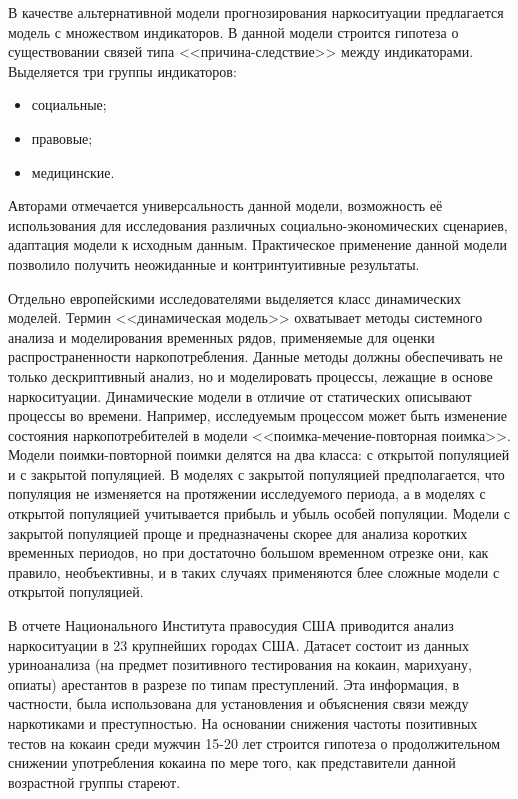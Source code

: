 В качестве альтернативной модели прогнозирования наркоситуации предлагается
модель с множеством индикаторов. В данной модели строится гипотеза о
существовании связей типа <<причина-следствие>> между индикаторами. Выделяется
три группы индикаторов: 
\begin{itemize}
    \item социальные;
    \item правовые;
    \item медицинские.
\end{itemize}
Авторами отмечается универсальность данной модели, возможность её использования
для исследования различных социально-экономических сценариев, адаптация модели к
исходным данным. Практическое применение данной модели позволило получить
неожиданные и контринтуитивные результаты. 

Отдельно европейскими исследователями выделяется класс динамических моделей.
Термин <<динамическая модель>> охватывает методы системного анализа и
моделирования временных рядов, применяемые для оценки распространенности
наркопотребления. Данные методы должны обеспечивать не только дескриптивный
анализ, но и моделировать процессы, лежащие в основе наркоситуации. Динамические
модели в отличие от статических описывают процессы во времени. Например,
исследуемым процессом может быть изменение состояния наркопотребителей в модели
<<поимка-мечение-повторная поимка>>. Модели поимки-повторной поимки делятся на
два класса: с открытой популяцией и с закрытой популяцией. В моделях с закрытой
популяцией предполагается, что популяция не изменяется на протяжении
исследуемого периода, а в моделях с открытой популяцией учитывается прибыль и
убыль особей популяции. Модели с закрытой популяцией проще и предназначены
скорее для анализа коротких временных периодов, но при достаточно большом
временном отрезке они, как правило, необъективны, и в таких случаях применяются
блее сложные модели с открытой популяцией.

В отчете Национального Института правосудия США \cite{TravisFeucht1995, Chaiken1993}
приводится анализ наркоситуации в 23 крупнейших городах США. Датасет состоит из
данных уриноанализа (на предмет позитивного тестирования на кокаин, марихуану,
опиаты) арестантов в разрезе по типам преступлений. Эта информация, в частности,
была использована для установления и объяснения связи между наркотиками и
преступностью. На основании снижения частоты позитивных тестов на кокаин среди
мужчин 15-20 лет строится гипотеза о продолжительном снижении употребления
кокаина по мере того, как представители данной возрастной группы стареют.

